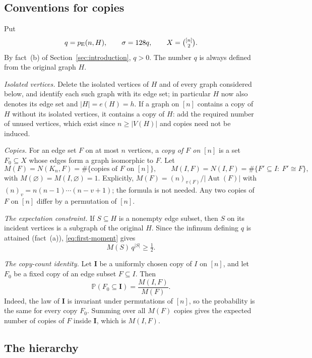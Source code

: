 \documentclass[11pt]{article}
\numberwithin{equation}{section}
\theoremstyle{remark}
\newcommand{\PP}{\mathbb P}
\newcommand{\pE}{p_{\mathrm E}}
\begin{document}
\subsection{Conventions for copies}

Put
\[
 q=\pE(n,H),\qquad \sigma=128q,\qquad X=\tbinom{[n]}2 .
\]
By fact~(b) of Section~\ref{sec:introduction}, $q>0$. The number $q$ is
always defined from the original graph $H$.

\emph{Isolated vertices.} Delete the isolated vertices of $H$ and of
every graph considered below, and identify each such graph with its edge
set; in particular $H$ now also denotes its edge set and $|H|=e(H)=h$.
If a graph on $[n]$ contains a copy of $H$ without its isolated
vertices, it contains a copy of $H$: add the required number of unused
vertices, which exist since $n\ge|V(H)|$ and copies need not be induced.

\emph{Copies.} For an edge set $F$ on at most $n$ vertices, a
\emph{copy of $F$ on $[n]$} is a set $F_0\subseteq X$ whose edges form a
graph isomorphic to $F$. Let
\[
 M(F)=N(K_n,F)=\#\{\text{copies of }F\text{ on }[n]\},\qquad
 M(I,F)=N(I,F)=\#\{F'\subseteq I:\ F'\cong F\},
\]
with $M(\varnothing)=M(I,\varnothing)=1$. Explicitly,
$M(F)=(n)_{v(F)}/|\operatorname{Aut}(F)|$ with
$(n)_v=n(n-1)\cdots(n-v+1)$; the formula is not needed. Any two copies
of $F$ on $[n]$ differ by a permutation of $[n]$.

\emph{The expectation constraint.} If $S\subseteq H$ is a nonempty edge
subset, then $S$ on its incident vertices is a subgraph of the original
$H$. Since the infimum defining $q$ is attained (fact~(a)),
\eqref{eq:first-moment} gives
\begin{equation}\label{eq:constraint}
 M(S)\,q^{|S|}\ge\tfrac12 .
\end{equation}

\emph{The copy-count identity.} Let $\boldsymbol I$ be a uniformly
chosen copy of $I$ on $[n]$, and let $F_0$ be a fixed copy of an edge
subset $F\subseteq I$. Then
\begin{equation}\label{eq:copy-ratio}
 \PP(F_0\subseteq\boldsymbol I)=\frac{M(I,F)}{M(F)}.
\end{equation}
Indeed, the law of $\boldsymbol I$ is invariant under permutations of
$[n]$, so the probability is the same for every copy $F_0$. Summing over
all $M(F)$ copies gives the expected number of copies of $F$ inside
$\boldsymbol I$, which is $M(I,F)$.

\subsection{The hierarchy}
\end{document}
